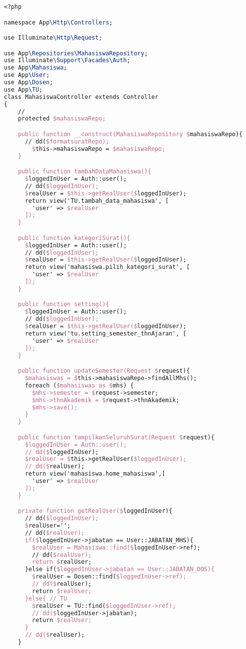 \begin{lstlisting}[language=tex,basicstyle=\tiny,caption=MahasiswasuratController.php]
<?php

namespace App\Http\Controllers;

use Illuminate\Http\Request;

use App\Repositories\MahasiswaRepository;
use Illuminate\Support\Facades\Auth;
use App\Mahasiswa;
use App\User;
use App\Dosen;
use App\TU;
class MahasiswaController extends Controller
{
    //
    protected $mahasiswaRepo;

    public function __construct(MahasiswaRepository $mahasiswaRepo){
      // dd($formatsuratRepo);
        $this->mahasiswaRepo = $mahasiswaRepo;
    }

    public function tambahDataMahasiswa(){
      $loggedInUser = Auth::user();
      // dd($loggedInUser);
      $realUser = $this->getRealUser($loggedInUser);
      return view('TU.tambah_data_mahasiswa', [
        'user' => $realUser
      ]);
    }

    public function kategoriSurat(){
      $loggedInUser = Auth::user();
      // dd($loggedInUser);
      $realUser = $this->getRealUser($loggedInUser);
      return view('mahasiswa.pilih_kategori_surat', [
        'user' => $realUser
      ]);
    }

    public function setting(){
      $loggedInUser = Auth::user();
      // dd($loggedInUser);
      $realUser = $this->getRealUser($loggedInUser);
      return view('tu.setting_semester_thnAjaran', [
        'user' => $realUser
      ]);
    }

    public function updateSemester(Request $request){
      $mahasiswas = $this->mahasiswaRepo->findAllMhs();
      foreach ($mahasiswas as $mhs) {
        $mhs->semester = $request->semester;
        $mhs->thnAkademik = $request->thnAkademik;
        $mhs->save();
      }
    }

    public function tampilkanSeluruhSurat(Request $request){
      $loggedInUser = Auth::user();
      // dd($loggedInUser);
      $realUser = $this->getRealUser($loggedInUser);
      // dd($realUser);
      return view('mahasiswa.home_mahasiswa',[
        'user' => $realUser
      ]);
    }

    private function getRealUser($loggedInUser){
      // dd($loggedInUser);
      $realUser='';
      // dd($realUser);
      if($loggedInUser->jabatan == User::JABATAN_MHS){
        $realUser = Mahasiswa::find($loggedInUser->ref);
        // dd($realUser);
        return $realUser;
      }else if($loggedInUser->jabatan == User::JABATAN_DOS){
        $realUser = Dosen::find($loggedInUser->ref);
        // dd($realUser);
        return $realUser;
      }else{ // TU
        $realUser = TU::find($loggedInUser->ref);
        // dd($loggedInUser->jabatan);
        return $realUser;
      }
      // dd($realUser);
    }


\end{lstlisting}
